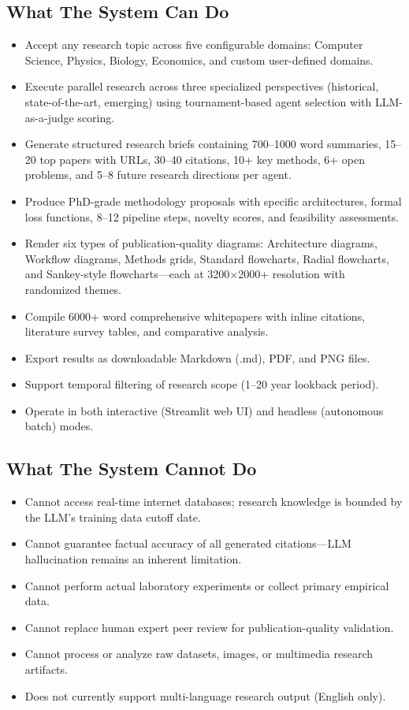 \documentclass[a4paper,12pt,openany]{report}
\begin{document}
\subsection{What The System Can Do}

\begin{itemize}[leftmargin=2cm]
\item Accept any research topic across five configurable domains: Computer Science, Physics, Biology, Economics, and custom user-defined domains.
\item Execute parallel research across three specialized perspectives (historical, state-of-the-art, emerging) using tournament-based agent selection with LLM-as-a-judge scoring.
\item Generate structured research briefs containing 700--1000 word summaries, 15--20 top papers with URLs, 30--40 citations, 10+ key methods, 6+ open problems, and 5--8 future research directions per agent.
\item Produce PhD-grade methodology proposals with specific architectures, formal loss functions, 8--12 pipeline steps, novelty scores, and feasibility assessments.
\item Render six types of publication-quality diagrams: Architecture diagrams, Workflow diagrams, Methods grids, Standard flowcharts, Radial flowcharts, and Sankey-style flowcharts---each at 3200$\times$2000+ resolution with randomized themes.
\item Compile 6000+ word comprehensive whitepapers with inline citations, literature survey tables, and comparative analysis.
\item Export results as downloadable Markdown (.md), PDF, and PNG files.
\item Support temporal filtering of research scope (1--20 year lookback period).
\item Operate in both interactive (Streamlit web UI) and headless (autonomous batch) modes.
\end{itemize}

\subsection{What The System Cannot Do}

\begin{itemize}[leftmargin=2cm]
\item Cannot access real-time internet databases; research knowledge is bounded by the LLM's training data cutoff date.
\item Cannot guarantee factual accuracy of all generated citations---LLM hallucination remains an inherent limitation.
\item Cannot perform actual laboratory experiments or collect primary empirical data.
\item Cannot replace human expert peer review for publication-quality validation.
\item Cannot process or analyze raw datasets, images, or multimedia research artifacts.
\item Does not currently support multi-language research output (English only).
\end{itemize}
\end{document}
